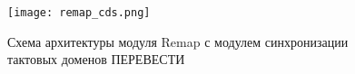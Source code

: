
\begin{figure}[ht]
    \centering
    \texttt{[image: remap\_cds.png]}
    \caption{Схема архитектуры модуля Remap с модулем синхронизации тактовых доменов ПЕРЕВЕСТИ}
    \label{fig:remap_cds}
\end{figure}\par

